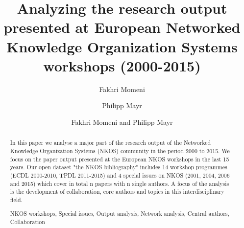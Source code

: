 \documentclass[runningheads,a4paper]{llncs}
\newcommand{\keywords}[1]{\par\addvspace\baselineskip
\noindent\keywordname\enspace\ignorespaces#1}
\begin{document}
\mainmatter  %

\title{Analyzing the research output presented at European Networked Knowledge Organization Systems workshops (2000-2015)}



%
%
\author{Fakhri Momeni%
	\and Philipp Mayr}
%

\author{Fakhri Momeni and Philipp Mayr}

%
%

\maketitle


\begin{abstract}		
In this paper we analyse a major part of the research output of the Networked Knowledge Organization Systems (NKOS) community in the period 2000 to 2015. We focus on the paper output presented at the European NKOS workshops in the last 15 years. Our open dataset "the NKOS bibliography" includes 14 workshop programmes (ECDL 2000-2010, TPDL 2011-2015) and 4 special  issues on NKOS (2001, 2004, 2006 and 2015) which cover in total n %
papers with n %
single authors. A focus of the analysis is the development of collaboration, core authors and topics in this interdisciplinary field. %

 
\keywords{NKOS workshops, Special issues, Output analysis, Network analysis, Central authors, Collaboration}
\end{abstract}
\end{document}
